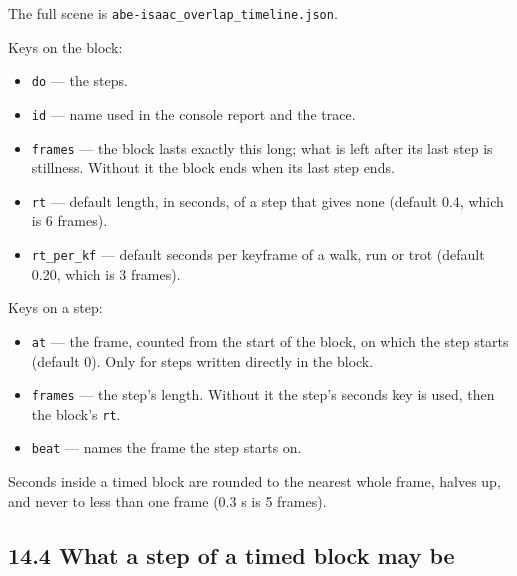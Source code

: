 \documentclass[
  12pt,
  letterpaper,
]{book}
\providecommand{\tightlist}{%
  \setlength{\itemsep}{0pt}\setlength{\parskip}{0pt}}
\begin{document}
The full scene is \texttt{abe-isaac\_overlap\_timeline.json}.

Keys on the block:

\begin{itemize}
\tightlist
\item
  \texttt{do} --- the steps.
\item
  \texttt{id} --- name used in the console report and the trace.
\item
  \texttt{frames} --- the block lasts exactly this long; what is left
  after its last step is stillness. Without it the block ends when its
  last step ends.
\item
  \texttt{rt} --- default length, in seconds, of a step that gives none
  (default 0.4, which is 6 frames).
\item
  \texttt{rt\_per\_kf} --- default seconds per keyframe of a walk, run
  or trot (default 0.20, which is 3 frames).
\end{itemize}

Keys on a step:

\begin{itemize}
\tightlist
\item
  \texttt{at} --- the frame, counted from the start of the block, on
  which the step starts (default 0). Only for steps written directly in
  the block.
\item
  \texttt{frames} --- the step's length. Without it the step's seconds
  key is used, then the block's \texttt{rt}.
\item
  \texttt{beat} --- names the frame the step starts on.
\end{itemize}

Seconds inside a timed block are rounded to the nearest whole frame,
halves up, and never to less than one frame (0.3 s is 5 frames).

\subsection{14.4 What a step of a timed block may be}\label{timed-block-steps}
\end{document}
